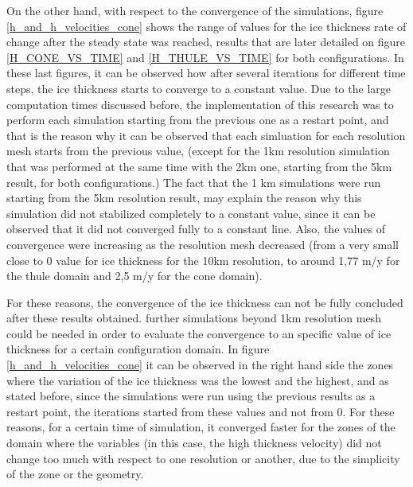 \documentclass{article}
\begin{document}
On the other hand, with respect to the convergence of the simulations, figure \ref{h_and_h_velocities_cone} shows the range of values for the ice thickness rate of change after the steady state was reached, results that are later detailed on figure \ref{H_CONE_VS_TIME} and \ref{H_THULE_VS_TIME} for both configurations. In these last figures, it can be observed how after several iterations for different time steps, the ice thickness starts to converge to a constant value. Due to the large computation times discussed before, the implementation of this research was to perform each simulation starting from the previous one as a restart point, and that is the reason why it can be observed that each simluation for each resolution mesh starts from the previous value, (except for the 1km resolution simulation that was performed at the same time with the 2km one, starting from the 5km result, for both configurations.) The fact that the 1 km simulations were run starting from the 5km resolution result, may explain the reason why this simulation did not stabilized completely to a constant value, since it can be observed that it did not converged fully to a constant line. Also, the values of convergence were increasing as the resolution mesh decreased (from a very small close to 0 value for ice thickness for the 10km resolution, to around 1,77 m/y for the thule domain and 2,5 m/y for the cone domain). 

For these reasons, the convergence of the ice thickness can not be fully concluded after these results obtained. further simulations beyond 1km resolution mesh could be needed in order to evaluate the convergence to an specific value of ice thickness for a certain configuration domain. In figure \ref{h_and_h_velocities_cone} it can be observed in the right hand side the zones where the variation of the ice thickness was the lowest and the highest, and as stated before, since the simulations were run using the previous results as a restart point, the iterations started from these values and not from 0. For these reasons, for a certain time of simulation, it converged faster for the zones of the domain where the variables (in this case, the high thickness velocity) did not change too much with respect to one resolution or another, due to the simplicity of the zone or the geometry.
\end{document}
